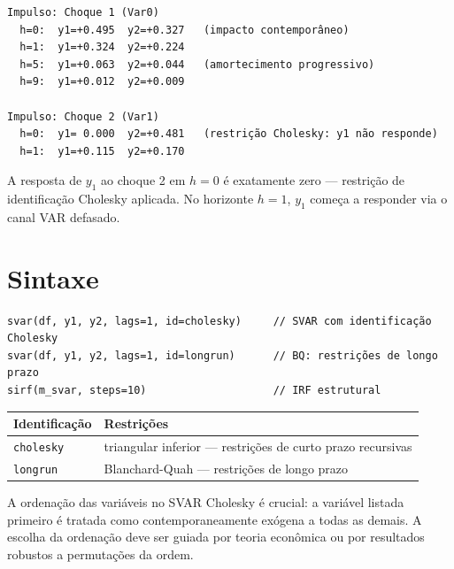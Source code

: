 \begin{lstlisting}[language={}, basicstyle=\ttfamily\small,
  frame=none, numbers=none, backgroundcolor=\color{codbg},
  xleftmargin=0pt, xrightmargin=0pt, breaklines=false]
Impulso: Choque 1 (Var0)
  h=0:  y1=+0.495  y2=+0.327   (impacto contemporâneo)
  h=1:  y1=+0.324  y2=+0.224
  h=5:  y1=+0.063  y2=+0.044   (amortecimento progressivo)
  h=9:  y1=+0.012  y2=+0.009

Impulso: Choque 2 (Var1)
  h=0:  y1= 0.000  y2=+0.481   (restrição Cholesky: y1 não responde)
  h=1:  y1=+0.115  y2=+0.170
\end{lstlisting}

A resposta de $y_1$ ao choque 2 em $h=0$ é exatamente zero — restrição de
identificação Cholesky aplicada. No horizonte $h=1$, $y_1$ começa a responder
via o canal VAR defasado.

\section{Sintaxe}

\begin{lstlisting}
svar(df, y1, y2, lags=1, id=cholesky)     // SVAR com identificação Cholesky
svar(df, y1, y2, lags=1, id=longrun)      // BQ: restrições de longo prazo
sirf(m_svar, steps=10)                    // IRF estrutural
\end{lstlisting}

\begin{center}
\begin{tabular}{ll}
\toprule
\textbf{Identificação} & \textbf{Restrições} \\
\midrule
\texttt{cholesky} & triangular inferior — restrições de curto prazo recursivas \\
\texttt{longrun}  & Blanchard-Quah — restrições de longo prazo \\
\bottomrule
\end{tabular}
\end{center}

\begin{nota}
  A ordenação das variáveis no SVAR Cholesky é crucial: a variável listada
  primeiro é tratada como contemporaneamente exógena a todas as demais.
  A escolha da ordenação deve ser guiada por teoria econômica ou por
  resultados robustos a permutações da ordem.
\end{nota}
